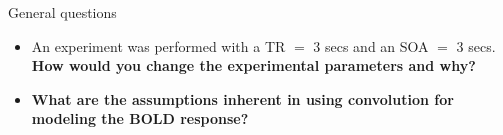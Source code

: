 \documentclass{beamer}
\begin{document}
\begin{frame}{General questions}
  \begin{itemize}
    \item An experiment was performed with a TR $=$ 3 secs and an SOA $=$ 3 secs. \textbf{How would you change the experimental parameters and why?}


    \bigskip
    \item \textbf{What are the assumptions inherent in using convolution for modeling the BOLD response?}

  \end{itemize}
\end{frame}

%
%
%
\end{document}
